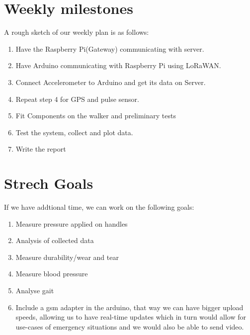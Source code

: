 \documentclass[conference]{IEEEtran}
\begin{document}
\section{Weekly milestones}
A rough sketch of our weekly plan is as follows:

\begin{enumerate}
	\item Have the Raspberry Pi(Gateway) communicating with server.
	\item Have Arduino communicating with Raspberry Pi using LoRaWAN.
	\item Connect Accelerometer to Arduino and get its data on Server.
	\item Repeat step 4 for GPS and pulse sensor.
	\item Fit Components on the walker and preliminary tests
	\item Test the system, collect and plot data.
	\item Write the report
\end{enumerate}

\section{Strech Goals}
If we have addtional time, we can work on the following goals:
\begin{enumerate}
	\item Measure pressure applied on handles
	\item Analysis of collected data
	\item Measure durability/wear and tear
	\item Measure blood pressure
	\item Analyse gait
	\item Include a gsm adapter in the arduino, that way we can have bigger upload speeds, allowing us to have real-time updates which in turn would allow for use-cases of emergency situations and we would also be able to send video.
\end{enumerate}

%

\end{document}

